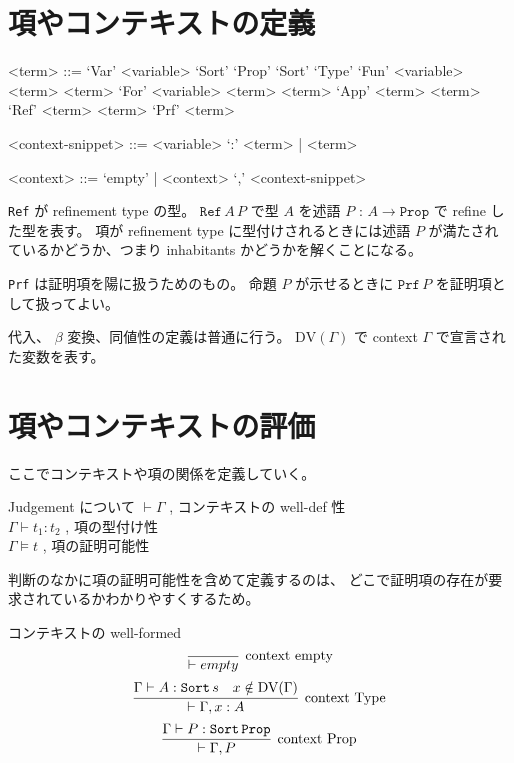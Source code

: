 \documentclass[dvipdfmx]{jsarticle}
\begin{document}
\section*{項やコンテキストの定義}
\begin{grammar}
<term> ::= `Var' <variable> 
\alt `Sort' `Prop'
\alt `Sort' `Type'
\alt `Fun' <variable> <term> <term>
\alt `For' <variable> <term> <term>
\alt `App' <term> <term>
\alt `Ref' <term> <term>
\alt `Prf' <term>

<context-snippet> ::= <variable> `:' <term> | <term>

<context> ::= `empty' | <context> `,' <context-snippet>
\end{grammar}

\texttt{Ref} が refinement type の型。
\(\texttt{Ref} \, A \, P\) で型 \(A\) を述語 \(P\) : \(A \to \texttt{Prop}\) で refine した型を表す。
項が refinement type に型付けされるときには述語 \(P\) が満たされているかどうか、つまり inhabitants かどうかを解くことになる。

\texttt{Prf} は証明項を陽に扱うためのもの。
命題 \(P\) が示せるときに \(\texttt{Prf} \, P\) を証明項として扱ってよい。

代入、 \(\beta\) 変換、同値性の定義は普通に行う。
\(\text{DV}(\Gamma)\) で context \(\Gamma\) で宣言された変数を表す。

\section*{項やコンテキストの評価}
ここでコンテキストや項の関係を定義していく。

\begin{itembox}[l]{Judgement について}
  \(\vdash \Gamma\) , コンテキストの well-def 性 \\
  \(\Gamma \vdash t_1 : t_2\) , 項の型付け性 \\
  \(\Gamma \vDash t\) , 項の証明可能性
\end{itembox}

判断のなかに項の証明可能性を含めて定義するのは、
どこで証明項の存在が要求されているかわかりやすくするため。

\begin{itembox}[l]{コンテキストの well-formed}
  \[\infer[\text{context empty}]{\vdash empty}{}\]
  \[\infer[\text{context Type}]{\vdash \Gamma , x : A}{\Gamma \vdash A : \texttt{Sort} \, s & x \notin \text{DV}(\Gamma)}\]
  \[\infer[\text{context Prop}]{\vdash \Gamma , P}{\Gamma \vdash P : \texttt{Sort} \, \texttt{Prop}}\]
\end{itembox}
\end{document}

